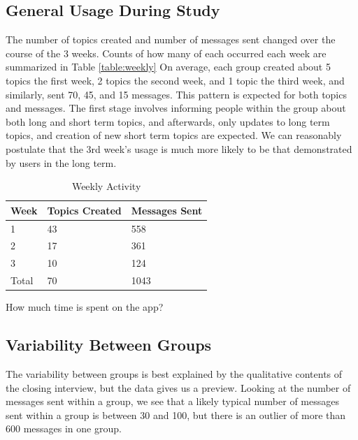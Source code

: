     \subsection{General Usage During Study}
      The number of topics created and number of messages sent changed over
      the course of the 3 weeks.
      Counts of how many of each occurred each week are summarized in
      Table \ref{table:weekly}
      On average, each group created about 5 topics the first week,
      2 topics the second week, and 1 topic the third week,
      and similarly, sent 70, 45, and 15 messages.
      This pattern is expected for both topics and messages.
      The first stage involves informing people within the
      group about both long and short term topics,
      and afterwards, only updates to long term topics,
      and creation of new short term topics are expected.
      We can reasonably postulate that the 3rd week's usage is much more likely
      to be that demonstrated by users in the long term.

      \begin{table}[h]
      \centering
      \caption{Weekly Activity}
      \label{table:compensation}
      \begin{tabular}{ l l l}
      Week & Topics Created & Messages Sent \\
      \hline
      1 & 43 & 558      \\[5pt]
      2 & 17 & 361      \\[5pt]
      3 & 10 & 124      \\[5pt]
      \hline
      Total & 70 & 1043       \\[5pt]
      \end{tabular}
      \end{table}

      How much time is spent on the app?

    \subsection{Variability Between Groups}

    The variability between groups is best explained by the
    qualitative contents of the closing interview,
    but the data gives us a preview.
    Looking at the number of messages sent within a group,
    we see that a likely typical number of messages sent within a group
    is between 30 and 100,
    but there is an outlier of more than 600 messages in one group.

